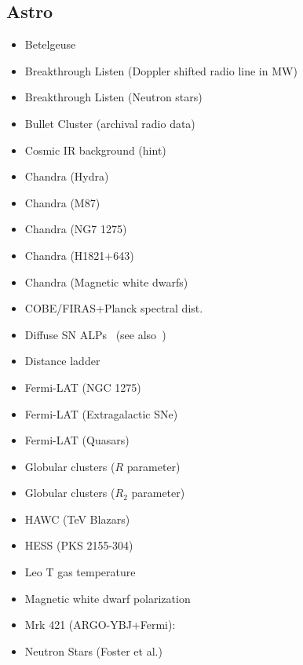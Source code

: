\documentclass[11pt,twocolumn]{extarticle}
\begin{document}
\begin{mdframed}[everyline=true]
\subsection*{Astro}\vspace{-0.5em}
\begin{itemize}\setlength\itemsep{-0.5em}
	\item Betelgeuse~\cite{Xiao:2020pra}
	\item Breakthrough Listen (Doppler shifted radio line in MW)~\cite{Keller:2021zbl}
	\item Breakthrough Listen (Neutron stars)~\cite{Foster:2022fxn}
    \item Bullet Cluster (archival radio data)~\cite{Chan:2021gjl}
  	\item Cosmic IR background (hint)~\cite{Kohri:2017ljt}
    \item Chandra (Hydra)~\cite{Wouters:2013hua}
    \item Chandra (M87)~\cite{Marsh:2017yvc}
    \item Chandra (NG7 1275)~\cite{Reynolds:2019uqt}
    \item Chandra (H1821+643)~\cite{Reynes:2021bpe}
    \item Chandra (Magnetic white dwarfs)~\cite{Reynes:2021bpe}
    \item COBE/FIRAS+Planck spectral dist.~\cite{Bolliet:2020ofj}
    \item Diffuse SN ALPs~\cite{Calore:2021hhn} (see also~\cite{Calore:2020tjw})
    \item Distance ladder~\cite{Buen-Abad:2020zbd}
    \item Fermi-LAT (NGC 1275)~\cite{Fermi-LAT:2016nkz}
    \item Fermi-LAT (Extragalactic SNe)~\cite{Meyer:2020vzy}
   	\item Fermi-LAT (Quasars)~\cite{Davies:2022wvj}
    \item Globular clusters ($R$ parameter)~\cite{Ayala:2014pea}
    \item Globular clusters ($R_2$ parameter)~\cite{Dolan:2022kul}
    \item HAWC (TeV Blazars)~\cite{Jacobsen:2022swa}
    \item HESS (PKS 2155-304)~\cite{HESS:2013udx}
    \item Leo T gas temperature~\cite{Wadekar:2021qae}
    \item Magnetic white dwarf polarization~\cite{Dessert:2022yqq}
    \item Mrk 421 (ARGO-YBJ+Fermi):~\cite{Li:2020pcn}
    \item Neutron Stars (Foster et al.)~\cite{Foster:2020pgt}

\end{itemize}
\end{mdframed}
\end{document}
